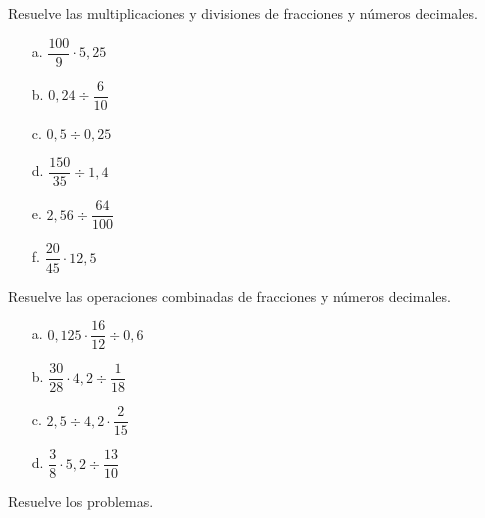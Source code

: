 \documentclass[spanish,letterpaper, 11pt, addpoints, answers]{exam}
\begin{document}
\begin{questions}
\question Resuelve las multiplicaciones y divisiones de fracciones y números decimales.

\begin{multicols}{2}
  \begin{itemize}
    \item[a.] $\dfrac{100}{9}\cdot 5{,}25$
    \item[b.] $0{,}24\div \dfrac{6}{10}$
    \item[c.] $0{,}5\div 0{,}25$
    \item[d.] $\dfrac{150}{35}\div 1{,}4$
    \item[e.] $2{,}56\div \dfrac{64}{100}$
    \item[f.] $\dfrac{20}{45}\cdot 12{,}5$
  \end{itemize}
\end{multicols}

\question Resuelve las operaciones combinadas de fracciones y números decimales.

\begin{multicols}{2}
  \begin{itemize}
    \item[a.] $0{,}125\cdot \dfrac{16}{12}\div 0{,}6$
    \item[b.] $\dfrac{30}{28}\cdot 4{,}2\div \dfrac{1}{18}$
    \item[c.] $2{,}5\div 4{,}2\cdot \dfrac{2}{15}$
    \item[d.] $\dfrac{3}{8}\cdot 5{,}2\div \dfrac{13}{10}$
  \end{itemize}
\end{multicols}


\question Resuelve los problemas.


\end{questions}
\end{document}
